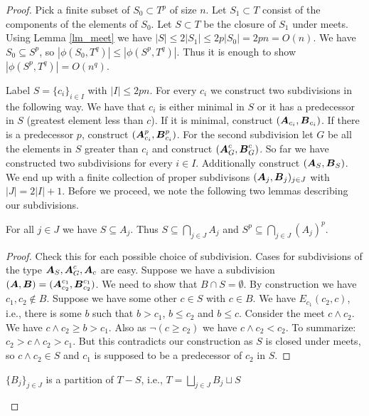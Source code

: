 \documentclass{amsart}
\DeclareMathOperator{\AT}{\boldface A}
\DeclareMathOperator{\BT}{\boldface B}
\begin{document}
\begin{proof}
  Pick a finite subset of $S_0 \subset T^p$ of size $n$. Let $S_1 \subset T$ consist of the components of the elements of $S_0$. Let $S \subset T$ be the closure of $S_1$ under meets. Using Lemma \ref{lm_meet} we have $|S| \leq 2|S_1| \leq 2p|S_0| = 2pn = O(n)$. We have $S_0 \subseteq S^p$, so $|\phi(S_0, T^q)| \leq |\phi(S^p, T^q)|$. Thus it is enough to show $|\phi(S^p, T^q)| = O(n^q)$.
  
  Label $S = \{c_i\}_{i \in I}$ with $|I| \leq 2pn$. For every $c_i$ we construct two subdivisions in the following way. We have that $c_i$ is either minimal in $S$ or it has a predecessor in $S$ (greatest element less than $c$). If it is minimal, construct $(\AT_{c_i}, \BT_{c_i})$. If there is a predecessor $p$, construct $(\AT^p_{c_i}, \BT^p_{c_i})$. For the second subdivision let $G$ be all the elements in $S$ greater than $c_i$ and construct $(\AT^c_G, \BT^c_G)$. So far we have constructed two subdivisions for every $i \in I$. Additionally construct $(\AT_S, \BT_S)$. We end up with a finite collection of proper subdivisons $(\AT_j, \BT_j)_{j \in J}$ with $|J| = 2|I| + 1$. Before we proceed, we note the following two lemmas describing our subdivisions.
  
  \begin{Lemma}
    For all $j \in J$ we have $S \subseteq A_j$. Thus $S \subseteq \bigcap_{j \in J} A_j$ and $S^p \subseteq \bigcap_{j \in J} (A_j)^p$. 
  \end{Lemma}
  
  \begin{proof}
    Check this for each possible choice of subdivision. Cases for subdivisions of the type $\AT_S, \AT^c_G, \AT_c$ are easy.
    Suppose we have a subdivision $(\AT, \BT) = (\AT^{c_1}_{c_2}, \BT^{c_1}_{c_2})$.
    We need to show that $B \cap S = \emptyset$.
    By construction we have $c_1, c_2 \notin B$.
    Suppose we have some other $c \in S$ with $c \in B$.
    We have $E_{c_1}(c_2, c)$, i.e., there is some $b$ such that $b > c_1$, $b \leq c_2$ and $b \leq c$.
    Consider the meet $c \wedge c_2$.
    We have $c \wedge c_2 \geq b > c_1$.
    Also as $\neg (c \geq c_2)$ we have $c \wedge c_2 < c_2$.
    To summarize: $c_2 > c \wedge c_2 > c_1$.
    But this contradicts our construction as $S$ is closed under meets,
    so $c \wedge c_2 \in S$ and $c_1$ is supposed to be a predecessor of $c_2$ in $S$.
  \end{proof}
  
  \begin{Lemma}
    $\{B_j\}_{j \in J}$ is a partition of $T - S$, i.e., $T = \bigsqcup_{j \in J} B_j \sqcup S$
  \end{Lemma}
  

\end{proof}
\end{document}
